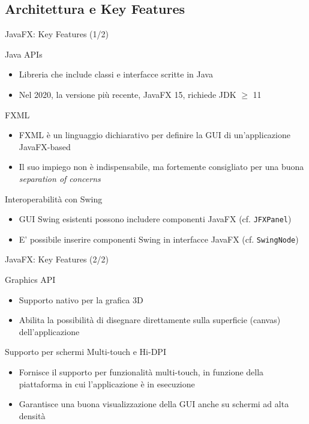 \documentclass[presentation]{beamer}
\begin{document}
\subsection{Architettura e Key Features}

\begin{frame}{JavaFX: Key Features (1/2)}
\begin{block}{Java APIs}
\begin{itemize}
\item Libreria che include classi e interfacce scritte in Java %
\item Nel 2020, la versione più recente, JavaFX 15, richiede JDK $\geq$ 11
\end{itemize}
\end{block}
%
\begin{block}{FXML}
\begin{itemize}
\item FXML è un linguaggio dichiarativo per definire la GUI di un'applicazione JavaFX-based
\item Il suo impiego non è indispensabile, ma fortemente consigliato per una buona \emph{separation of concerns}
\end{itemize}
\end{block}
%
\begin{block}{Interoperabilità con Swing}
\begin{itemize}
\item GUI Swing esistenti possono includere componenti JavaFX (cf. \texttt{JFXPanel})
\item E' possibile inserire componenti Swing in interfacce JavaFX (cf. \texttt{SwingNode})
\end{itemize}
\end{block}
\end{frame}

\begin{frame}{JavaFX: Key Features (2/2)}
\begin{block}{Graphics API}
\begin{itemize}
\item Supporto nativo per la grafica 3D
\item Abilita la possibilità di disegnare direttamente sulla superficie (canvas) dell'applicazione
\end{itemize}
\end{block}
%
\begin{block}{Supporto per schermi Multi-touch e Hi-DPI}
\begin{itemize}
\item Fornisce il supporto per funzionalità  multi-touch, in funzione della piattaforma in cui l'applicazione è in esecuzione
\item Garantisce una buona visualizzazione della GUI anche su schermi ad alta densità
\end{itemize}
\end{block}
\end{frame}
\end{document}
